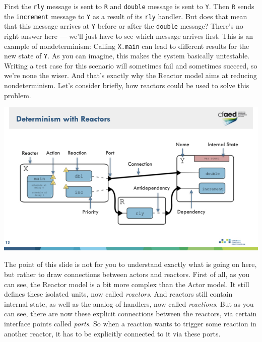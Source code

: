 \documentclass{article}
\begin{document}
First the \verb|rly| message is sent to \verb|R| and \verb|double| message is sent to \verb|Y|.
Then \verb|R| sends the \verb|increment| message to \verb|Y| as a result of its \verb|rly| handler.
But does that mean that this message arrives at \verb|Y| before or after the \verb|double| message?
There's no right answer here --- we'll just have to see which message arrives first.
This is an example of nondeterminism: 
Calling \verb|X.main| can lead to different results for the new state of \verb|Y|. 
As you can imagine, this makes the system basically untestable.
Writing a test case for this scenario will sometimes fail and sometimes succeed, so we're none the wiser.
And that's exactly why the Reactor model aims at reducing nondeterminism.
Let's consider briefly, how reactors could be used to solve this problem.

\begin{center}
    \includegraphics[width=\columnwidth]{Slides/Slide 13.jpeg}
\end{center}

The point of this slide is not for you to understand exactly what is going on here, but rather to draw connections between actors and reactors.
First of all, as you can see, the Reactor model is a bit more complex than the Actor model.
It still defines these isolated units, now called \emph{reactors}.
And reactors still contain internal state, as well as the analog of handlers, now called \emph{reactions}.
But as you can see, there are now these explicit connections between the reactors, via certain interface points called \emph{ports}.
So when a reaction wants to trigger some reaction in another reactor, it has to be explicitly connected to it via these ports.
\end{document}
